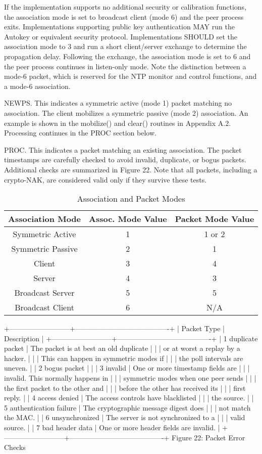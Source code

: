 If the implementation supports no additional security or calibration
functions, the association mode is set to broadcast client (mode 6)
and the peer process exits. Implementations supporting public key
authentication MAY run the Autokey or equivalent security protocol.
Implementations SHOULD set the association mode to 3 and run a short
client/server exchange to determine the propagation delay. Following
the exchange, the association mode is set to 6 and the peer process
continues in listen-only mode. Note the distinction between a mode-6
packet, which is reserved for the NTP monitor and control functions,
and a mode-6 association.

NEWPS. This indicates a symmetric active (mode 1) packet matching no
association. The client mobilizes a symmetric passive (mode 2)
association. An example is shown in the mobilize() and clear()
routines in Appendix A.2. Processing continues in the PROC section
below.

PROC. This indicates a packet matching an existing association. The
packet timestamps are carefully checked to avoid invalid, duplicate,
or bogus packets. Additional checks are summarized in Figure 22.
Note that all packets, including a crypto-NAK, are considered valid
only if they survive these tests.

\begin{table}[htb]
\center
\begin{tabular}{c | c | c}
Association Mode & Assoc. Mode Value & Packet Mode Value \\
\hline
\hline
Symmetric Active & 1 & 1 or 2 \\
Symmetric Passive & 2 & 1 \\
Client & 3 & 4 \\
Server & 4 & 3 \\
Broadcast Server & 5 & 5 \\
Broadcast Client & 6 & N/A \\
\hline
\end{tabular}
\label{association_and_packet_modes}
\caption{Association and Packet Modes}
\end{table}

+--------------------------+----------------------------------------+
| Packet Type | Description |
+--------------------------+----------------------------------------+
| 1 duplicate packet | The packet is at best an old duplicate |
| | or at worst a replay by a hacker. |
| | This can happen in symmetric modes if |
| | the poll intervals are uneven. |
| 2 bogus packet | |
| 3 invalid | One or more timestamp fields are |
| | invalid. This normally happens in |
| | symmetric modes when one peer sends |
| | the first packet to the other and |
| | before the other has received its |
| | first reply. |
| 4 access denied | The access controls have blacklisted |
| | the source. |
| 5 authentication failure | The cryptographic message digest does |
| | not match the MAC. |
| 6 unsynchronized | The server is not synchronized to a |
| | valid source. |
| 7 bad header data | One or more header fields are invalid. |
+--------------------------+----------------------------------------+
Figure 22: Packet Error Checks

